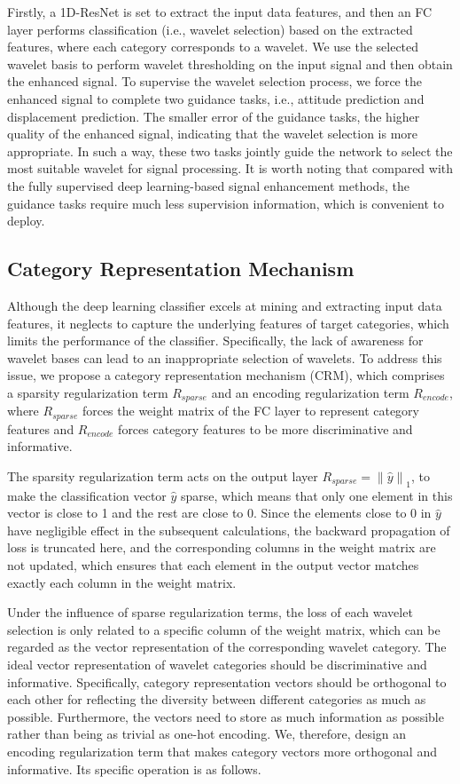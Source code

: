 \documentclass[letterpaper]{article}
\begin{document}
	Firstly, a 1D-ResNet is set to extract the input data features, and then an FC layer performs classification (i.e., wavelet selection) based on the extracted features, where each category corresponds to a wavelet. We use the selected wavelet basis to perform wavelet thresholding on the input signal and then obtain the enhanced signal. To supervise the wavelet selection process, we force the enhanced signal to complete two guidance tasks, i.e., attitude prediction and displacement prediction. The smaller error of the guidance tasks, the higher quality of the enhanced signal, indicating that the wavelet selection is more appropriate. In such a way, these two tasks jointly guide the network to select the most suitable wavelet for signal processing. It is worth noting that compared with the fully supervised deep learning-based signal enhancement methods, the guidance tasks require much less supervision information, which is convenient to deploy.


	\subsection{Category Representation Mechanism}
	Although the deep learning classifier excels at mining and extracting input data features, it neglects to capture the underlying features of target categories, which limits the performance of the classifier. Specifically, the lack of awareness for wavelet bases can lead to an inappropriate selection of wavelets.
	To address this issue, we propose a category representation mechanism (CRM), which comprises a sparsity regularization term $R_{sparse}$ and an encoding regularization term $R_{encode}$, where $R_{sparse}$ forces the weight matrix of the FC layer to represent category features and $R_{encode}$ forces category features to be more discriminative and informative.

	The sparsity regularization term acts on the output layer ${R_{sparse}} = {\left\| {\hat y} \right\|_1}$, to make the classification vector $\hat{y}$ sparse, which means that only one element in this vector is close to 1 and the rest are close to 0.
	Since the elements close to 0 in $\hat{y}$ have negligible effect in the subsequent calculations, the backward propagation of loss is truncated here, and the corresponding columns in the weight matrix are not updated, which ensures that each element in the output vector matches exactly each column in the weight matrix.


	Under the influence of sparse regularization terms, the loss of each wavelet selection is only related to a specific column of the weight matrix, which can be regarded as the vector representation of the corresponding wavelet category. The ideal vector representation of wavelet categories should be discriminative and informative. Specifically, category representation vectors should be orthogonal to each other for reflecting the diversity between different categories as much as possible. Furthermore, the vectors need to store as much information as possible rather than being as trivial as one-hot encoding.
	We, therefore, design an encoding regularization term that makes category vectors more orthogonal and informative. Its specific operation is as follows.
\end{document}
